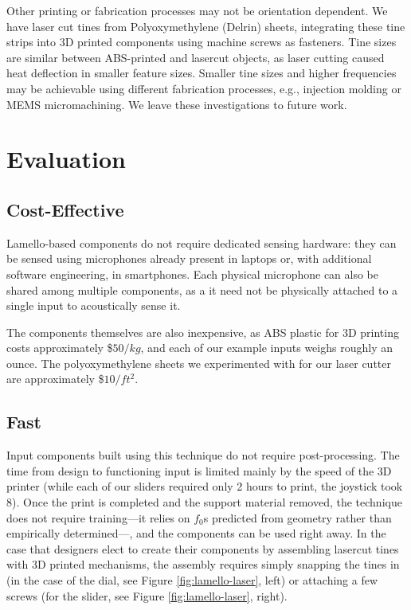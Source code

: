     Other printing or fabrication processes may not be orientation dependent. We have laser cut tines from Polyoxymethylene (Delrin) sheets, integrating these tine strips into 3D printed components using machine screws as fasteners. Tine sizes are similar between ABS-printed and lasercut objects, as laser cutting caused heat deflection in smaller feature sizes. Smaller tine sizes and higher frequencies may be achievable using different fabrication processes, e.g., injection molding or MEMS micromachining. We leave these investigations to future work.

\section{Evaluation}

    \subsection{Cost-Effective}
    Lamello-based components do not require dedicated sensing hardware: they can be sensed using microphones already present in laptops or, with additional software engineering, in smartphones. Each physical microphone can also be shared among multiple components, as a it need not be physically attached to a single input to acoustically sense it.
    
    The components themselves are also inexpensive, as ABS plastic for 3D printing costs approximately \$$50/kg$, and each of our example inputs weighs roughly an ounce. The polyoxymethylene sheets we experimented with for our laser cutter are approximately \$$10/ft^2$.
    
    \subsection{Fast}
    Input components built using this technique do not require post-processing. The time from design to functioning input is limited mainly by the speed of the 3D printer (while each of our sliders required only 2 hours to print, the joystick took 8). Once the print is completed and the support material removed, the technique does not require training---it relies on $f_0$s predicted from geometry rather than empirically determined---, and the components can be used right away. In the case that designers elect to create their components by assembling lasercut tines with 3D printed mechanisms, the assembly requires simply snapping the tines in (in the case of the dial, see Figure \ref{fig:lamello-laser}, left) or attaching a few screws (for the slider, see Figure \ref{fig:lamello-laser}, right).
    
